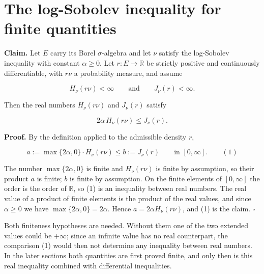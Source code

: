 \documentclass[11pt,a4paper]{article}
\begin{document}
\section{\texorpdfstring{The log-Sobolev inequality for finite quantities}{The log-Sobolev inequality for finite quantities}}


\textbf{Claim.} Let \(E\) carry its Borel \(\sigma\)-algebra and let \(\nu\) satisfy the log-Sobolev inequality with constant \(\alpha\ge0\). Let \(r:E\to\mathbb R\) be strictly positive and continuously differentiable, with \(r\nu\) a probability measure, and assume


\[H_\nu(r\nu)<\infty\qquad\text{and}\qquad J_\nu(r)<\infty.\]


Then the real numbers \(H_\nu(r\nu)\) and \(J_\nu(r)\) satisfy


\[2\alpha\,H_\nu(r\nu)\le J_\nu(r).\]


\textbf{Proof.} By the definition applied to the admissible density \(r\),


\[a:=\max\{2\alpha,0\}\cdot H_\nu(r\nu)\le b:=J_\nu(r)\qquad\text{in }[0,\infty].\qquad(1)\]


The number \(\max\{2\alpha,0\}\) is finite and \(H_\nu(r\nu)\) is finite by assumption, so their product \(a\) is finite; \(b\) is finite by assumption. On the finite elements of \([0,\infty]\) the order is the order of \(\mathbb R\), so (1) is an inequality between real numbers. The real value of a product of finite elements is the product of the real values, and since \(\alpha\ge0\) we have \(\max\{2\alpha,0\}=2\alpha\). Hence \(a=2\alpha H_\nu(r\nu)\), and (1) is the claim. \(\square\)




Both finiteness hypotheses are needed. Without them one of the two extended values could be \(+\infty\); since an infinite value has no real counterpart, the comparison (1) would then not determine any inequality between real numbers. In the later sections both quantities are first proved finite, and only then is this real inequality combined with differential inequalities.
\end{document}
